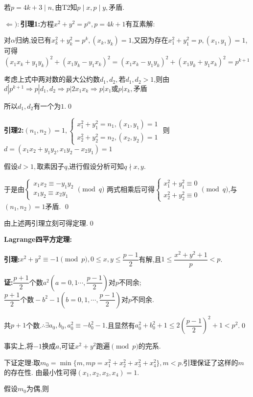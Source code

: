 若$ p=4k+3 \mid n,$由T2知$ p\mid x, p\mid y,$矛盾.

$ \Leftarrow ):${\bf 引理1:}方程$ x^2 + y^2=p^\alpha, p = 4k+1$有互素解:

对$ \alpha $归纳,设已有$ x_k^2 +y_k^2=p^k, (x_k,y_k)=1$,又因为存在$ x_1^2+y_1^2=p,(x_1,y_1)=1$,可得
$ (x_1x_k+y_1y_k)^2+(x_1y_k-y_1x_k)^2=(x_1x_k-y_1y_k)^2+(x_1y_k+y_1x_k)^2=p^{k+1}$

考虑上式中两对数的最大公约数$ d_1,d_2,$若$ d_1,d_2>1$,则由$ d|p^{k+1}\Rightarrow p|d_1,d_2\Rightarrow p|2x_1x_k\Rightarrow p|x_1或p|x_k,矛盾$

所以$ d_1,d_2$有一个为$ 1$.\qed

{\bf 引理2:}$ (n_1,n_2)=1,\left\{ \begin{matrix} x_1^2+y_1^2=n_1,(x_1,y_1)=1 \\
	x_2^2+y_2^2=n_2,(x_2,y_2)=1\end{matrix} \right .$ 则$ d=(x_1x_2+y_1y_2,x_1y_2-x_2y_1)=1$

假设$ d>1,$取素因子$ q$,进行假设分析可知$ q\nmid x,y$.

于是由$\left \{\begin{matrix}x_1x_2 \equiv -y_1y_2 \\ x_1y_2\equiv x_2y_1 \end{matrix}\right.\pmod q$
	两式相乘后可得$ \left \{ \begin{matrix}x_1^2+y_1^2\equiv 0 \\ x_2^2+y_2^2\equiv 0 \end{matrix}\right.\pmod q$,与$ (n_1,n_2)=1$矛盾. \qed

由上述两引理立刻可得定理.\qed

{\bf Lagrange四平方定理:}

{\bf 引理:}$ x^2+y^2\equiv -1\pmod p,0\le x,y\le \dfrac{p-1}{2}$有解,且$ 1\le \dfrac{x^2+y^2+1}{p}<p$.

{\bf 证:}$ \dfrac{p+1}{2}个数a^2(a=0,1\cdots,\dfrac{p-1}{2})$对$ p$不同余;$ \dfrac{p+1}{2}个数-b^2-1(b=0,1,\cdots,\dfrac{p-1}{2})$对$ p$不同余.

共$ p+1$个数.$ \therefore \exists a_0,b_0, a_0^2\equiv -b_0^2-1$.且显然有$ a_0^2+b_0^2+1\le 2(\dfrac{p-1}{2})^2+1<p^2$.\qed

{\small 事实上,将$ -1$换成$ a$,可证$ x^2+y^2$跑遍$ \pmod p$的完系.}

下证定理:取$ m_0=\min\{m,mp = x_1^2+x_2^2+x_3^2+x_4^2\},m<p$.引理保证了这样的$ m$的存在性.  
由最小性可得$ (x_1,x_2,x_3,x_4)=1$.

假设$ m_0$为偶,则


